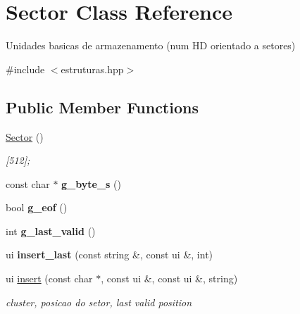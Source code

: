 \hypertarget{classSector}{}\section{Sector Class Reference}
\label{classSector}


Unidades basicas de armazenamento (num HD orientado a setores)  




{\ttfamily \#include $<$estruturas.\+hpp$>$}

\subsection*{Public Member Functions}
\begin{DoxyCompactItemize}
\item 
\hyperlink{classSector_acba0ffc50e70c7b4dac61a190d26b019}{Sector} ()\hypertarget{classSector_acba0ffc50e70c7b4dac61a190d26b019}{}\label{classSector_acba0ffc50e70c7b4dac61a190d26b019}

\begin{DoxyCompactList}\small\item\em \mbox{[}512\mbox{]}; \end{DoxyCompactList}\item 
const char $\ast$ {\bfseries g\+\_\+byte\+\_\+s} ()\hypertarget{classSector_ab5d1a8835ec6b6ca219747f792079748}{}\label{classSector_ab5d1a8835ec6b6ca219747f792079748}

\item 
bool {\bfseries g\+\_\+eof} ()\hypertarget{classSector_a0de4324c638872ff7f81899257883fe7}{}\label{classSector_a0de4324c638872ff7f81899257883fe7}

\item 
int {\bfseries g\+\_\+last\+\_\+valid} ()\hypertarget{classSector_aaa5f0478cd5e73cf792a98c73772e0ec}{}\label{classSector_aaa5f0478cd5e73cf792a98c73772e0ec}

\item 
ui {\bfseries insert\+\_\+last} (const string \&, const ui \&, int)\hypertarget{classSector_a3de8da2bad055e2b4cd3d665633053b6}{}\label{classSector_a3de8da2bad055e2b4cd3d665633053b6}

\item 
ui \hyperlink{classSector_a934dc752fbfb2b98075c500904b2ca6b}{insert} (const char $\ast$, const ui \&, const ui \&, string)
\begin{DoxyCompactList}\small\item\em cluster, posicao do setor, last valid position \end{DoxyCompactList}\end{DoxyCompactItemize}


